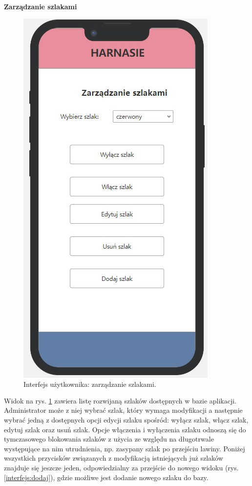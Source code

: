    \textbf{Zarządzanie szlakami}
     \begin{figure}[H]
        \centering
        \includegraphics[scale=0.5]{img/interfejsy/if_zarzadzaj_szlaki.jpg}
        \caption{Interfejs użytkownika: zarządzanie szlakami.}
        \label{interfejs:szlaki}
    \end{figure}
   Widok na rys. \ref{interfejs:szlaki} zawiera listę rozwijaną szlaków dostępnych w bazie aplikacji. Administrator może z niej wybrać szlak, który wymaga modyfikacji a następnie wybrać jedną z dostępnych opcji edycji szlaku spośród: wyłącz szlak, włącz szlak, edytuj szlak oraz usuń szlak. Opcje włączenia i wyłączenia szlaku odnoszą się do tymczasowego blokowania szlaków z użycia ze względu na długotrwale występujące na nim utrudnienia, np. zasypany szlak po przejściu lawiny. Poniżej wszystkich przycisków związanych z modyfikacją istniejących już szlaków znajduje się jeszcze jeden, odpowiedzialny za  przejście do nowego widoku (rys. \ref{interfejs:dodaj}), gdzie możliwe jest dodanie nowego szlaku do bazy. \\
